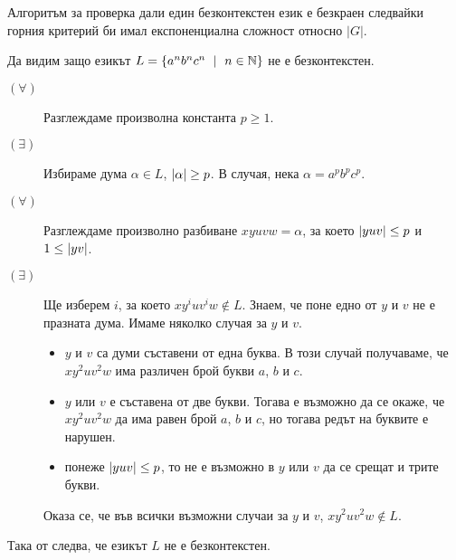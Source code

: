 
\begin{remark}
  Алгоритъм за проверка дали един безконтекстен език е безкраен следвайки горния критерий би 
  имал експоненциална сложност относно $|G|$.
\end{remark}

\begin{example}
  \label{ex:anbncn}
  Да видим защо езикът $L = \{a^nb^nc^n\ \mid\ n\in\mathbb{N}\}$ не е безконтекстен.
  \begin{description}
  \item[$(\forall)$]
    Разглеждаме произволна константа $p \geq 1$.
  \item[$(\exists)$]
    Избираме дума $\alpha \in L$, $\vert{\alpha}\vert \geq p$.
    В случая, нека $\alpha = a^pb^pc^p$.
  \item[$(\forall)$]
    Разглеждаме произволно разбиване $xyuvw = \alpha$, за което $\vert{yuv}\vert \leq p$ и $1 \leq \vert{yv}\vert$.
  \item[$(\exists)$]
    Ще изберем $i$, за което $xy^iuv^iw \not\in L$.
    Знаем, че поне едно от $y$ и $v$ не е празната дума.
    Имаме няколко случая за $y$ и $v$.
    \begin{itemize}
    \item
      $y$ и $v$ са думи съставени от една буква.
      В този случай получаваме, че $xy^2uv^2w$ има различен брой букви $a$, $b$ и $c$.
    \item
      $y$ или $v$ е съставена от две букви.
      Тогава е възможно да се окаже, че $xy^2uv^2w$ да има равен брой $a$, $b$ и $c$,
      но тогава редът на буквите е нарушен.
    \item
      понеже $\vert{yuv}\vert \leq p$, то не е възможно в $y$ или $v$ да се срещат и трите букви.
    \end{itemize}  
    Оказа се, че във всички възможни случаи за $y$ и $v$, 
    $xy^2uv^2w \not\in L$.
  \end{description}
  Така от  следва, че езикът $L$ не е безконтекстен.
\end{example}

